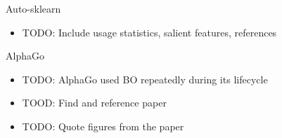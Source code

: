 
\begin{frame}[c]{Auto-sklearn}
\pause
\begin{itemize}
    \item<+-> TODO: Include usage statistics, salient features, references
\end{itemize}
\end{frame}


\begin{frame}[c]{AlphaGo}
\pause
\begin{itemize}
    \item<+-> TODO: AlphaGo used BO repeatedly during its lifecycle
    \item<+-> TOOD: Find and reference paper
    \item<+-> TODO: Quote figures from the paper
\end{itemize}
\end{frame}


